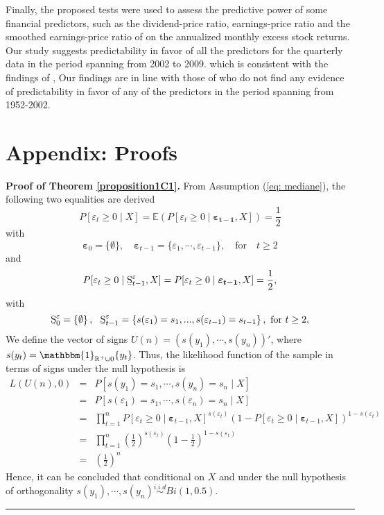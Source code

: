 \documentclass[harvard,11pt]{article}
\newcommand{\E}{\mathbb{E}}
\newenvironment{proof}[1][Proof]{\textbf{#1.} }{\  \rule{0.5em}{0.5em}}
\begin{document}
Finally, the proposed tests were used to assess the predictive power of some
financial predictors, such as the dividend-price ratio, earnings-price ratio and the smoothed earnings-price ratio of \citet{campbell1988dividend,campbell2001valuation} on the annualized monthly excess stock returns. Our study suggests predictability in favor of all the predictors for the quarterly data in the period spanning from 2002 to 2009. which is consistent with the findings of \citet{campbell2006efficient}, Our findings are in line with those of \citet{campbell2006efficient} who do not find any evidence of predictability in favor of any of the predictors in the period spanning from 1952-2002. 

\newpage

 

\newpage

\section{Appendix: Proofs \label{Appendix: ProofsC1}}

\begin{proof}[Proof of Theorem \protect\ref{proposition1C1}]
 From Assumption (\ref{eq: mediane}), the following two equalities are derived
\[
P[\varepsilon_t\geq0\mid X]=\E\left(P[\varepsilon_t\geq 0\mid\bm{\varepsilon_{t-1}},X ]\right)=\frac{1}{2}
\]
with
\[
\bm{\varepsilon}_0=\{\emptyset\},\quad \bm{\varepsilon}_{t-1}=\{\varepsilon_1,\cdots,\varepsilon_{t-1}\},\quad\text{for}\quad t\geq 2
\]
and
\[
P[\varepsilon_t\geq0\mid \text{\b{S}}^{\varepsilon}_{t-1}, X]=P[\varepsilon_t\geq 0\mid\bm{\varepsilon_{t-1}},X ]=\frac{1}{2},
\]
with
\[
\text{\b{S}}^{\varepsilon}_{0}=\left\{ \emptyset \right\} ,\text{ \ \b{S}}^{\varepsilon}_{t-1}=\left\{
s(\varepsilon_{1})=s_{1},...,s(\varepsilon_{t-1})=s_{t-1}\right\} ,\text{ for }t\geq 2,
\]
We define the vector of signs $U(n)=(s(y_1),\cdots,s(y_n))'$, where $s(y_t)=\mathbbm{1}_{\mathbb{R}^+\cup 0}\{y_t\}$. Thus, the likelihood function of the sample in terms of signs under the null hypothesis is
\begin{eqnarray*}
L(U(n),0)&=&P[s(y_1)=s_1,\cdots,s(y_n)=s_n\mid X]\\
&=&P[s(\varepsilon_1)=s_1,\cdots,s(\varepsilon_n)=s_n\mid X]\\
&=&\prod\limits_{t=1}^{n}P[\varepsilon_t\geq0\mid\bm{\varepsilon}_{t-1},X]^{s(\varepsilon_t)}\left(1-P[\varepsilon_t\geq0\mid\bm{\varepsilon}_{t-1},X]\right)^{1-s(\varepsilon_t)}\\
&=&\prod\limits_{t=1}^{n}\left(\frac{1}{2}\right)^{s(\varepsilon_t)}\left(1-\frac{1}{2}\right)^{1-s(\varepsilon_t)}\\
&=&\left(\frac{1}{2}\right)^n
\end{eqnarray*}
Hence, it can be concluded that conditional on $X$ and under the null hypothesis of orthogonality $s(y_1),\cdots,s(y_n)\overset{i.i.d}{\sim}Bi(1,0.5)$.
\end{proof}
\end{document}
